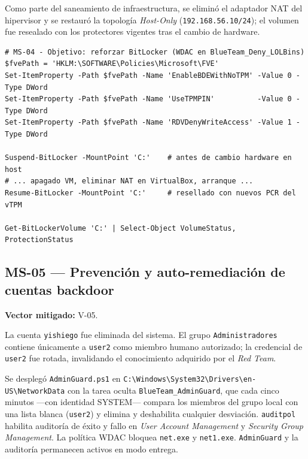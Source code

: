 Como parte del saneamiento de infraestructura, se eliminó el adaptador NAT del hipervisor y se restauró la topología \textit{Host-Only} (\texttt{192.168.56.10/24}); el volumen fue resealado con los protectores vigentes tras el cambio de hardware.

\begin{lstlisting}[caption={MS-04 --- Objetivo: políticas FVE y verificación de BitLocker.}]
# MS-04 - Objetivo: reforzar BitLocker (WDAC en BlueTeam_Deny_LOLBins)
$fvePath = 'HKLM:\SOFTWARE\Policies\Microsoft\FVE'
Set-ItemProperty -Path $fvePath -Name 'EnableBDEWithNoTPM' -Value 0 -Type DWord
Set-ItemProperty -Path $fvePath -Name 'UseTPMPIN'          -Value 0 -Type DWord
Set-ItemProperty -Path $fvePath -Name 'RDVDenyWriteAccess' -Value 1 -Type DWord

Suspend-BitLocker -MountPoint 'C:'    # antes de cambio hardware en host
# ... apagado VM, eliminar NAT en VirtualBox, arranque ...
Resume-BitLocker -MountPoint 'C:'     # resellado con nuevos PCR del vTPM

Get-BitLockerVolume 'C:' | Select-Object VolumeStatus, ProtectionStatus
\end{lstlisting}

\subsection{MS-05 --- Prevención y auto-remediación de cuentas backdoor}

\textbf{Vector mitigado:} V-05.

La cuenta \texttt{yishiego} fue eliminada del sistema. El grupo \texttt{Administradores} contiene únicamente a \texttt{user2} como miembro humano autorizado; la credencial de \texttt{user2} fue rotada, invalidando el conocimiento adquirido por el \textit{Red Team}.

Se desplegó \texttt{AdminGuard.ps1} en \texttt{C:\textbackslash}\allowbreak\texttt{Windows\textbackslash}\allowbreak\texttt{System32\textbackslash}\allowbreak\texttt{Drivers\textbackslash}\allowbreak\texttt{en-US\textbackslash}\allowbreak\texttt{NetworkData} con la tarea oculta \texttt{BlueTeam\_}\allowbreak\texttt{AdminGuard}, que cada cinco minutos ---con identidad SYSTEM--- compara los miembros del grupo local con una lista blanca (\texttt{user2}) y elimina y deshabilita cualquier desviación. \texttt{auditpol} habilita auditoría de éxito y fallo en \textit{User Account Management} y \textit{Security Group Management}. La política WDAC bloquea \texttt{net.exe} y \texttt{net1.exe}. \texttt{AdminGuard} y la auditoría permanecen activos en modo entrega.

